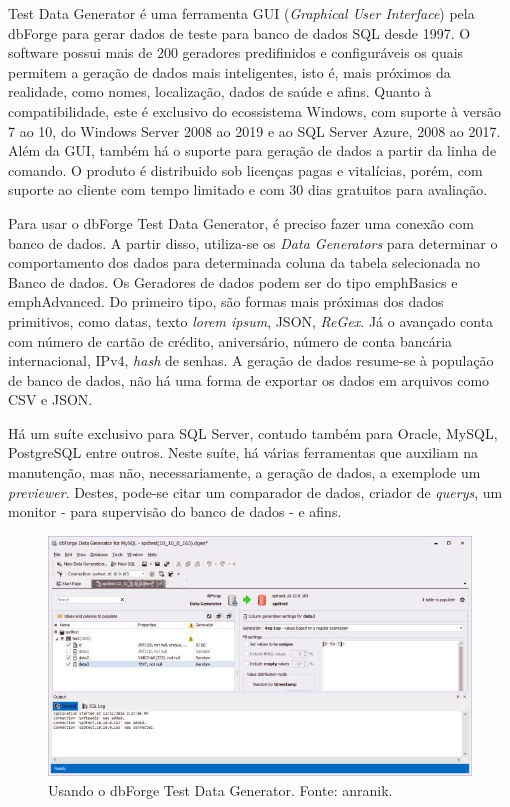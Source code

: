 \documentclass[
	12pt,				%
	openright,			%
	twoside,			%
	a4paper,			%
	english,			%
	brazil				%
	]{abntex2}
\begin{document}
			Test Data Generator \cite{forgeDBDataGenerator} é uma ferramenta GUI (\emph{Graphical User Interface}) pela dbForge para gerar dados de teste para banco de dados SQL desde 1997.
			O software possui mais de 200 geradores predifinidos e configuráveis os quais permitem a geração de dados mais inteligentes, isto é, mais próximos da realidade, como nomes, localização, dados de saúde e afins.
			Quanto à compatibilidade, este é exclusivo do ecossistema Windows, com suporte à versão 7 ao 10, do Windows Server 2008 ao 2019 e ao SQL Server Azure, 2008 ao 2017.
			Além da GUI, também há o suporte para geração de dados a partir da linha de comando.
			O produto é distribuido sob licenças pagas e vitalícias, porém, com suporte ao cliente com tempo limitado e com 30 dias gratuitos para avaliação.
			\par
			Para usar o dbForge Test Data Generator, é preciso fazer uma conexão com banco de dados. 
			A partir disso, utiliza-se os \emph{Data Generators} para determinar o comportamento dos dados para determinada coluna da tabela selecionada no Banco de dados.
			Os Geradores de dados podem ser do tipo emph{Basics} e emph{Advanced}. 
			Do primeiro tipo, são formas mais próximas dos dados primitivos, como datas, texto \emph{lorem ipsum}, JSON, \emph{ReGex}.
			Já o avançado conta com número de cartão de crédito, aniversário, número de conta bancária internacional, IPv4, \emph{hash} de senhas.  
			A geração de dados resume-se à população de banco de dados, não há uma forma de exportar os dados em arquivos como CSV e JSON.
			\par
			Há um suíte exclusivo para SQL Server, contudo também para Oracle, MySQL, PostgreSQL entre outros.
			Neste suíte, há várias ferramentas que auxiliam na manutenção, mas não, necessariamente, a geração de dados, a exemplode um \emph{previewer}.
			Destes, pode-se citar um comparador de dados, criador de \emph{querys}, um monitor - para supervisão do banco de dados - e afins.
			\begin{figure}[h]
				\centering
				\includegraphics[width=\linewidth]{./figures/TrabalhosRelacionados/dbForge-Test-Data-Generator.jpg}
				\caption{Usando o dbForge Test Data Generator. Fonte: anranik.}
				\label{fig:dbForgeTDG}
			\end{figure}
\end{document}
